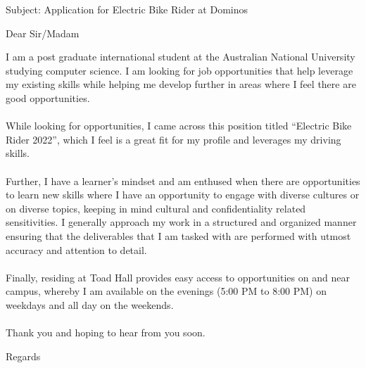\documentclass{letter}
\begin{document}
\begin{letter}{Subject: Application for Electric Bike Rider at Dominos }
\opening{Dear Sir/Madam}
I am a post graduate international student at the Australian National University studying computer science. I am looking for job opportunities that help leverage my existing skills while helping me develop further in areas where I feel there are good opportunities.\\ \\
While looking for opportunities, I came across this position titled “Electric Bike Rider 2022”, which I feel is a great fit for my profile and leverages my driving skills.  \\ \\
Further, I have a learner’s mindset and am enthused when there are opportunities to learn new skills where I have an opportunity to engage with diverse cultures or on diverse topics, keeping in mind cultural and confidentiality related sensitivities. I generally approach my work in a structured and organized manner ensuring that the deliverables that I am tasked with are performed with utmost accuracy and attention to detail. \\ \\
Finally, residing at Toad Hall provides easy access to opportunities on and near campus, whereby I am available on the evenings (5:00 PM to 8:00 PM) on weekdays and all day on the weekends.  \\ \\
Thank you and hoping to hear from you soon.
\closing{Regards}
\end{letter}
\end{document}

